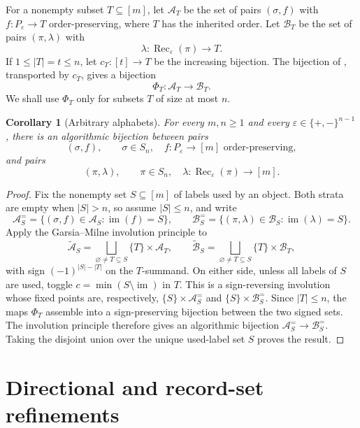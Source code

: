 \documentclass[11pt,letterpaper,reqno]{amsart}
\newtheorem{corollary}[theorem]{Corollary}
\theoremstyle{definition}
\newcommand{\eps}{\varepsilon}
\begin{document}
For a nonempty subset \(T\subseteq[m]\), let \(\mathcal A_T\) be the set of
pairs \((\sigma,f)\) with \(f:P_\eps\to T\) order-preserving, where \(T\) has
the inherited order.  Let \(\mathcal B_T\) be the set of pairs
\((\pi,\lambda)\) with
\[
\lambda:\operatorname{Rec}_\eps(\pi)\to T.
\]
If \(1\le |T|=t\le n\), let \(c_T:[t]\to T\) be the increasing bijection.  The
bijection of , transported by \(c_T\), gives
a bijection
\[
\Phi_T:\mathcal A_T\longrightarrow \mathcal B_T.
\]
We shall use \(\Phi_T\) only for subsets \(T\) of size at most \(n\).

\begin{corollary}[Arbitrary alphabets]
\label{thm:direct-bijection-all-m}
For every \(m,n\ge1\) and every \(\eps\in\{+,-\}^{n-1}\), there is an
algorithmic bijection between pairs
\[
(\sigma,f),\qquad
\sigma\in S_n,\quad f:P_\eps\to[m]\text{ order-preserving},
\]
and pairs
\[
(\pi,\lambda),\qquad
\pi\in S_n,\quad
\lambda:\operatorname{Rec}_\eps(\pi)\to[m].
\]
\end{corollary}

\begin{proof}
Fix the nonempty set \(S\subseteq[m]\) of labels used by an object.  Both
strata are empty when \(|S|>n\), so assume \(|S|\le n\), and write
\[
\mathcal A_S^{=}
=\{(\sigma,f)\in\mathcal A_S:\operatorname{im}(f)=S\},
\qquad
\mathcal B_S^{=}
=\{(\pi,\lambda)\in\mathcal B_S:\operatorname{im}(\lambda)=S\}.
\]
Apply the Garsia--Milne involution principle \cite{GarsiaMilne} to
\[
\widetilde{\mathcal A}_S
=\bigsqcup_{\varnothing\ne T\subseteq S}\{T\}\times\mathcal A_T,
\qquad
\widetilde{\mathcal B}_S
=\bigsqcup_{\varnothing\ne T\subseteq S}\{T\}\times\mathcal B_T,
\]
with sign \((-1)^{|S|-|T|}\) on the \(T\)-summand.  On either side, unless
all labels of \(S\) are used, toggle
\(c=\min(S\setminus\operatorname{im})\) in \(T\).  This is a sign-reversing
involution whose fixed points are, respectively,
\(\{S\}\times\mathcal A_S^{=}\) and
\(\{S\}\times\mathcal B_S^{=}\).  Since \(|T|\le n\), the maps \(\Phi_T\)
assemble into a sign-preserving bijection between the two signed sets.
The involution principle therefore gives an algorithmic bijection
\(\mathcal A_S^{=}\longrightarrow\mathcal B_S^{=}\).  Taking the disjoint
union over the unique used-label set \(S\) proves the result.
\end{proof}

\section{Directional and record-set refinements}
\label{sec:signed-strict-edge-transfer}
\end{document}
